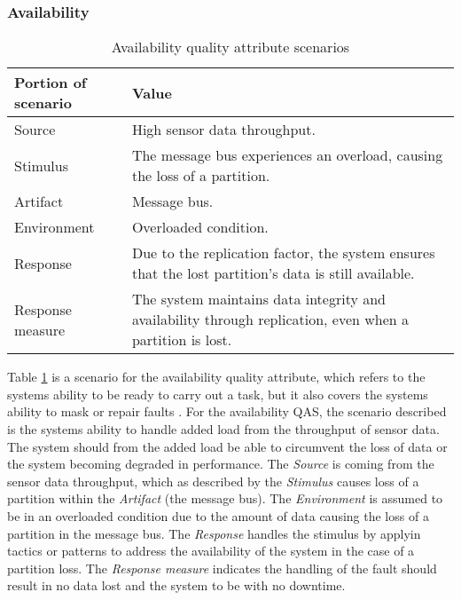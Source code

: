 \documentclass[conference]{IEEEtran}
\begin{document}
\subsubsection{Availability}

\begin{table}[h]
    \renewcommand{\arraystretch}{1.3}
    \caption{Availability quality attribute scenarios}
    \label{availability}
    \centering
    \begin{tabularx}{\columnwidth}{>{\hsize=0.3\hsize}X>{\hsize=0.7\hsize}X}
        \hline
        \textbf{Portion of scenario} & \textbf{Value}                                                                                           \\
        \hline
        Source                       & High sensor data throughput.                                                                             \\
        Stimulus                     & The message bus experiences an overload, causing the loss of a partition.                                \\
        Artifact                     & Message bus.                                                                                             \\
        Environment                  & Overloaded condition.                                                                                    \\
        Response                     & Due to the replication factor, the system ensures that the lost partition's data is still available.     \\
        Response measure             & The system maintains data integrity and availability through replication, even when a partition is lost. \\
        \hline
    \end{tabularx}
\end{table}

Table \ref{availability} is a scenario for the availability quality attribute, which refers to the systems ability to be ready to carry out a task, but it also covers the systems ability to mask or repair faults \cite{bass2021software}.
For the availability QAS, the scenario described is the systems ability to handle added load from the throughput of sensor data. The system should from the added load be able to circumvent the loss of data or the system becoming degraded in performance.
The \textit{Source} is coming from the sensor data throughput, which as described by the \textit{Stimulus} causes loss of a partition within the \textit{Artifact} (the message bus). The \textit{Environment} is assumed to be in an overloaded condition due to the amount of data causing the loss of a partition in the message bus.
The \textit{Response} handles the stimulus by applyin tactics or patterns to address the availability of the system in the case of a partition loss. The \textit{Response measure} indicates the handling of the fault should result in no data lost and the system to be with no downtime. \newline
\end{document}
